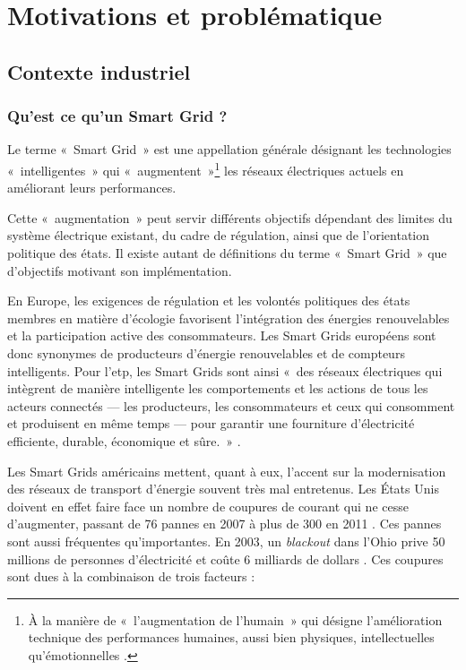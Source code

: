\chapter{Motivations et problématique}
\label{ch:problematique}

\PartialToc

\section{Contexte industriel}

\subsection{Qu'est ce qu'un Smart Grid ?}

Le terme «~Smart Grid~» est une appellation générale désignant les technologies 
«~intelligentes~» qui «~augmentent~»\footnote{À la manière de «~l'augmentation 
de l'humain~» qui désigne l'amélioration technique des performances humaines, 
aussi bien physiques, intellectuelles qu'émotionnelles \cite{le2013humain}.} 
les réseaux électriques actuels en améliorant leurs performances. 

Cette «~augmentation~» peut servir différents objectifs dépendant des limites du 
système électrique existant, du cadre de régulation, ainsi que de 
l'orientation politique des états. Il existe autant de définitions du terme 
«~Smart Grid~» que d'objectifs motivant son implémentation. 

En Europe, les exigences de régulation et les volontés politiques des états 
membres en matière d'écologie favorisent l'intégration des énergies 
renouvelables et la participation active des consommateurs. Les Smart Grids 
européens sont donc synonymes de producteurs d'énergie renouvelables et de 
compteurs intelligents. Pour l'\gls{etp}, les Smart Grids sont ainsi «~des 
réseaux électriques qui intègrent de manière intelligente les comportements et 
les actions de tous les acteurs connectés — les producteurs, les consommateurs 
et ceux qui consomment et produisent en même temps — pour garantir une 
fourniture d'électricité efficiente, durable, économique et sûre.~» \cite{ETP}.

Les Smart Grids américains mettent, quant à eux, l'accent sur la modernisation 
des réseaux de transport d'énergie souvent très mal entretenus. Les États Unis 
doivent en effet faire face un nombre de coupures de courant qui ne cesse 
d'augmenter, passant de 76 pannes en 2007 à plus de 300 en 2011 \cite{detroit}. 
Ces pannes sont aussi fréquentes qu'importantes. En 2003, un \textit{blackout} 
dans l'Ohio prive 50 millions de personnes d'électricité et coûte 6 milliards 
de dollars \cite{andersson2005causes}. Ces coupures sont dues à la combinaison 
de trois facteurs \cite{outages}:

